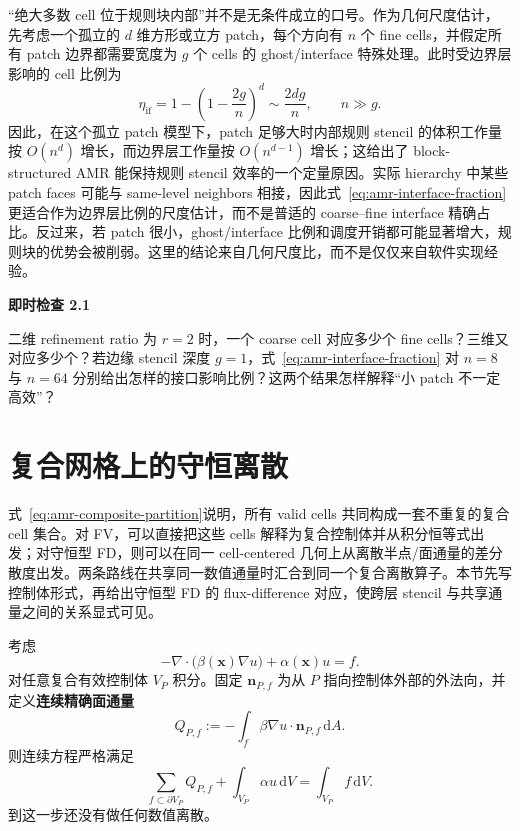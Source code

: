 “绝大多数 cell 位于规则块内部”并不是无条件成立的口号。作为几何尺度估计，先考虑一个孤立的 $d$ 维方形或立方 patch，每个方向有 $n$ 个 fine cells，并假定所有 patch 边界都需要宽度为 $g$ 个 cells 的 ghost/interface 特殊处理。此时受边界层影响的 cell 比例为
\begin{equation}
\eta_{\mathrm{if}}
=
1-\left(1-\frac{2g}{n}\right)^d
\sim
\frac{2dg}{n},
\qquad n\gg g.
\label{eq:amr-interface-fraction}
\end{equation}
因此，在这个孤立 patch 模型下，patch 足够大时内部规则 stencil 的体积工作量按 $O(n^d)$ 增长，而边界层工作量按 $O(n^{d-1})$ 增长；这给出了 block-structured AMR 能保持规则 stencil 效率的一个定量原因。实际 hierarchy 中某些 patch faces 可能与 same-level neighbors 相接，因此式~\eqref{eq:amr-interface-fraction} 更适合作为边界层比例的尺度估计，而不是普适的 coarse--fine interface 精确占比。反过来，若 patch 很小，ghost/interface 比例和调度开销都可能显著增大，规则块的优势会被削弱。这里的结论来自几何尺度比，而不是仅仅来自软件实现经验\cite{zhang2019amrex,zhang2021amrex}。

\begin{checkpointbox}
\textbf{即时检查 2.1}

二维 refinement ratio 为 $r=2$ 时，一个 coarse cell 对应多少个 fine cells？三维又对应多少个？若边缘 stencil 深度 $g=1$，式~\eqref{eq:amr-interface-fraction} 对 $n=8$ 与 $n=64$ 分别给出怎样的接口影响比例？这两个结果怎样解释“小 patch 不一定高效”？
\end{checkpointbox}

\section{复合网格上的守恒离散}
\label{sec:amr-composite-conservation}

式~\eqref{eq:amr-composite-partition}说明，所有 valid cells 共同构成一套不重复的复合 cell 集合。对 FV，可以直接把这些 cells 解释为复合控制体并从积分恒等式出发；对守恒型 FD，则可以在同一 cell-centered 几何上从离散半点/面通量的差分散度出发。两条路线在共享同一数值通量时汇合到同一个复合离散算子。本节先写控制体形式，再给出守恒型 FD 的 flux-difference 对应，使跨层 stencil 与共享通量之间的关系显式可见。

考虑
\begin{equation}
-\nabla\cdot\bigl(\beta(\bm x)\nabla u\bigr)
+\alpha(\bm x)u=f.
\label{eq:amr_general_operator}
\end{equation}
对任意复合有效控制体 $V_P$ 积分。固定 $\bm n_{P,f}$ 为从 $P$ 指向控制体外部的外法向，并定义\textbf{连续精确面通量}
\begin{equation}
Q_{P,f}
:=-\int_f\beta\nabla u\cdot\bm n_{P,f}\,\mathrm dA.
\label{eq:amr-exact-face-flux}
\end{equation}
则连续方程严格满足
\begin{equation}
\sum_{f\subset\partial V_P}Q_{P,f}
+\int_{V_P}\alpha u\,\mathrm dV
=
\int_{V_P}f\,\mathrm dV.
\label{eq:amr-exact-cell-balance}
\end{equation}
到这一步还没有做任何数值离散。

